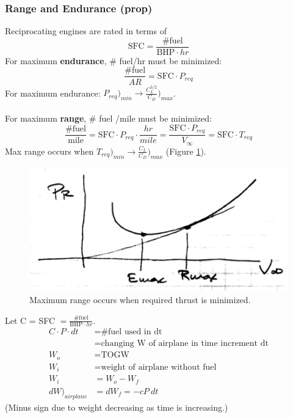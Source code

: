 \documentclass[draft=false, titlepage]{article}
\begin{document}
\subsubsection{Range and Endurance (prop)}
Reciprocating engines are rated in terms of
\begin{equation}
\text{SFC} = \frac{\text{\# fuel}}{\text{BHP}\cdot hr}
\end{equation}
For maximum \textbf{endurance}, \# fuel/hr must be minimized:
\begin{equation*}
\frac{\text{\# fuel}}{AR} = \text{SFC} \cdot P_{req}
\end{equation*}
For maximum endurance: $P_{req}\big)_{min} \rightarrow \frac{C_L^{3/2}}{C_D}\big)_{max}$.
\paragraph*{}\noindent For maximum \textbf{range}, \# fuel /mile must be minimized:
\begin{equation*}
\frac{\text{\# fuel}}{\text{mile}} = \text{SFC} \cdot P_{req}\cdot \frac{hr}{mile} = \frac{\text{SFC}\cdot P_{req}}{V_\infty} = \text{SFC} \cdot T_{req}
\end{equation*}
Max range occurs when $T_{req}\big)_{min} \rightarrow \frac{C_L}{C_D}\big)_{max}$ (Figure \ref{fig:p87_maxRange}).
\begin{figure}[ht]
	\centering
	\includegraphics[width=0.4\linewidth]{Figures/p87_maxRange.PNG}
	\caption{Maximum range occurs when required thrust is minimized.}
	\label{fig:p87_maxRange}
\end{figure}

Let C = SFC $= \frac{\text{\# fuel}}{\text{BHP}\cdot hr}$.
\begin{align*}
C\cdot P \cdot dt &= \text{\# fuel used in dt}\\
&= \text{changing W of airplane in time increment dt}\\
W_o &= \text{TOGW}\\
W_i &= \text{weight of airplane without fuel}\\
W_i &= W_o - W_f\\
dW\big)_{airplane} &= dW_f = -cP\ dt
\end{align*}
(Minus sign due to weight decreasing as time is increasing.)
\end{document}
